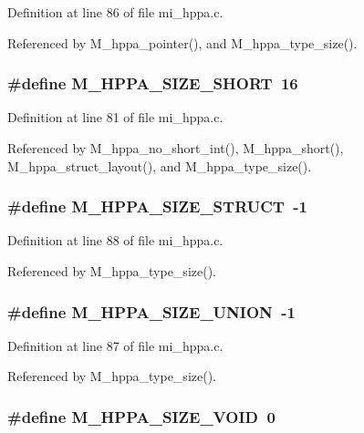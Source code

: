 Definition at line 86 of file mi\_\-hppa.c.

Referenced by M\_\-hppa\_\-pointer(), and M\_\-hppa\_\-type\_\-size().
\subsubsection{\setlength{\rightskip}{0pt plus 5cm}\#define M\_\-HPPA\_\-SIZE\_\-SHORT~16}\label{mi__hppa_8c_c879911fb9c041da0caad3520e6a2854}




Definition at line 81 of file mi\_\-hppa.c.

Referenced by M\_\-hppa\_\-no\_\-short\_\-int(), M\_\-hppa\_\-short(), M\_\-hppa\_\-struct\_\-layout(), and M\_\-hppa\_\-type\_\-size().
\subsubsection{\setlength{\rightskip}{0pt plus 5cm}\#define M\_\-HPPA\_\-SIZE\_\-STRUCT~-1}\label{mi__hppa_8c_164ea80278883780c01125e8fdac3c03}




Definition at line 88 of file mi\_\-hppa.c.

Referenced by M\_\-hppa\_\-type\_\-size().
\subsubsection{\setlength{\rightskip}{0pt plus 5cm}\#define M\_\-HPPA\_\-SIZE\_\-UNION~-1}\label{mi__hppa_8c_c30f05b423c2b238daa8652b258a5fa4}




Definition at line 87 of file mi\_\-hppa.c.

Referenced by M\_\-hppa\_\-type\_\-size().
\subsubsection{\setlength{\rightskip}{0pt plus 5cm}\#define M\_\-HPPA\_\-SIZE\_\-VOID~0}\label{mi__hppa_8c_7542ee4bf37e1b175b204432a9b56f0a}




